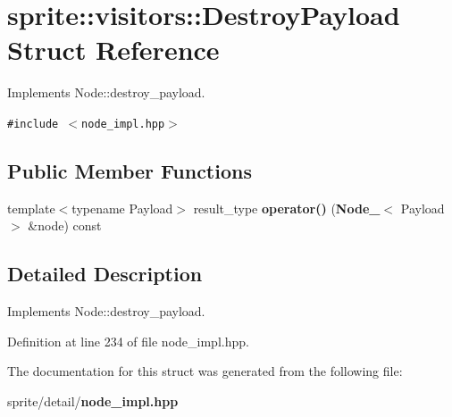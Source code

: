 \section{sprite::visitors::Destroy\-Payload Struct Reference}
\label{structsprite_1_1visitors_1_1DestroyPayload}
Implements Node::destroy\_\-payload.  


{\tt \#include $<$node\_\-impl.hpp$>$}

\subsection*{Public Member Functions}
\begin{CompactItemize}
\item 
template$<$typename Payload$>$ result\_\-type {\bf operator()} ({\bf Node\_\-}$<$ Payload $>$ \&node) const \label{structsprite_1_1visitors_1_1DestroyPayload_a0}

\end{CompactItemize}


\subsection{Detailed Description}
Implements Node::destroy\_\-payload. 



Definition at line 234 of file node\_\-impl.hpp.

The documentation for this struct was generated from the following file:\begin{CompactItemize}
\item 
sprite/detail/{\bf node\_\-impl.hpp}\end{CompactItemize}
